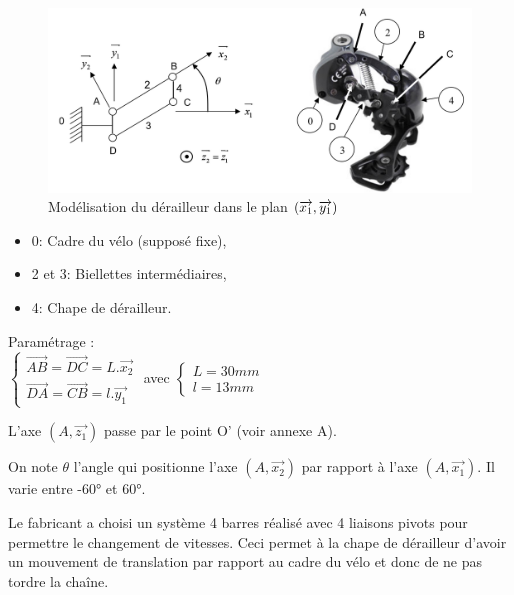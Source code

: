 \begin{figure}[!h]
 \centering\includegraphics[width=0.8\linewidth]{img/img04}
 \caption{Modélisation du dérailleur dans le plan $(\protect\overrightarrow{x_1},\protect\overrightarrow{y_1})$}
 \label{img04}
\end{figure}

\begin{itemize}
 \item 0: Cadre du vélo (supposé fixe),
 \item 2 et 3: Biellettes intermédiaires,
 \item 4: Chape de dérailleur.
\end{itemize}

Paramétrage :\\
$\left\{\begin{array}{l}
\overrightarrow{AB}=\overrightarrow{DC}=L.\overrightarrow{x_2} \\
\overrightarrow{DA}=\overrightarrow{CB}=l.\overrightarrow{y_1}
\end{array}\right.$  avec 
$\left\{\begin{array}{l}
L=30mm \\
l=13mm
\end{array}\right.$ 

L'axe $(A,\overrightarrow{z_1})$ passe par le point O' (voir annexe A).

On note $\theta$ l'angle qui positionne l'axe $(A,\overrightarrow{x_2})$ par rapport à l'axe $(A,\overrightarrow{x_1})$. Il varie entre -60° et 60°.

Le fabricant a choisi un système 4 barres réalisé avec 4 liaisons pivots pour permettre le changement de vitesses. Ceci permet à la chape de dérailleur d'avoir un mouvement de translation par rapport au cadre du vélo et donc de ne pas tordre la chaîne.


